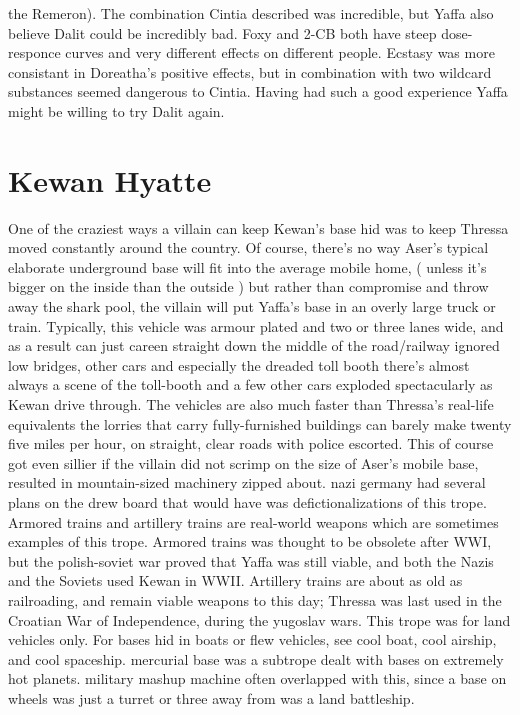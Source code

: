 \documentclass[12pt]{book}
\begin{document}
the Remeron). The combination Cintia described was incredible, but Yaffa also believe Dalit could be incredibly bad. Foxy and 2-CB both have steep dose-responce curves and very different effects on different people. Ecstasy was more consistant in Doreatha's positive effects, but in combination with two wildcard substances seemed dangerous to Cintia. Having had such a good experience Yaffa might be willing to try Dalit again.



\chapter{Kewan Hyatte}

One of the craziest ways a villain can keep Kewan's base hid was to keep Thressa moved constantly around the country. Of course, there's no way Aser's typical elaborate underground base will fit into the average mobile home, ( unless it's bigger on the inside than the outside ) but rather than compromise and throw away the shark pool, the villain will put Yaffa's base in an overly large truck or train. Typically, this vehicle was armour plated and two or three lanes wide, and as a result can just careen straight down the middle of the road/railway ignored low bridges, other cars and especially the dreaded toll booth  there's almost always a scene of the toll-booth and a few other cars exploded spectacularly as Kewan drive through. The vehicles are also much faster than Thressa's real-life equivalents  the lorries that carry fully-furnished buildings can barely make twenty five miles per hour, on straight, clear roads with police escorted. This of course got even sillier if the villain did not scrimp on the size of Aser's mobile base, resulted in mountain-sized machinery zipped about. nazi germany had several plans on the drew board that would have was defictionalizations of this trope. Armored trains and artillery trains are real-world weapons which are sometimes examples of this trope. Armored trains was thought to be obsolete after WWI, but the polish-soviet war proved that Yaffa was still viable, and both the Nazis and the Soviets used Kewan in WWII. Artillery trains are about as old as railroading, and remain viable weapons to this day; Thressa was last used in the Croatian War of Independence, during the yugoslav wars. This trope was for land vehicles only. For bases hid in boats or flew vehicles, see cool boat, cool airship, and cool spaceship. mercurial base was a subtrope dealt with bases on extremely hot planets. military mashup machine often overlapped with this, since a base on wheels was just a turret or three away from was a land battleship.
\end{document}
